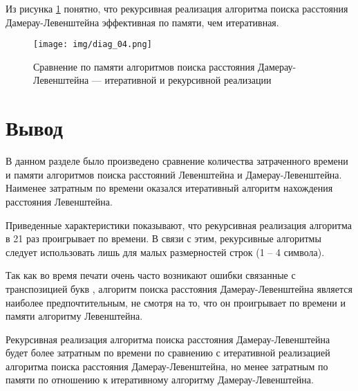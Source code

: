Из рисунка \ref{plt:memory_1} понятно, что рекурсивная реализация алгоритма поиска расстояния Дамерау-Левенштейна эффективная по памяти, чем итеративная.

\begin{figure}[h]
	\centering
	\texttt{[image: img/diag\_04.png]}
	\caption{Сравнение по памяти алгоритмов поиска расстояния Дамерау-Левенштейна --- итеративной и рекурсивной реализации}
	\label{plt:memory_1}
\end{figure}

\clearpage

\section{Вывод}

В данном разделе было произведено сравнение количества затраченного времени и памяти алгоритмов поиска расстояний Левенштейна и Дамерау-Левенштейна. Наименее затратным по времени оказался итеративный алгоритм нахождения расстояния Левенштейна.

Приведенные характеристики показывают, что рекурсивная реализация алгоритма в 21 раз проигрывает по времени. В связи с этим, рекурсивные алгоритмы следует использовать лишь для малых размерностей строк (1 -- 4 символа).

Так как во время печати очень часто возникают ошибки связанные с транспозицией букв \cite{ulianov}, алгоритм поиска расстояния Дамерау-Левенштейна является наиболее предпочтительным, не смотря на то, что он проигрывает по времени и памяти алгоритму Левенштейна.

Рекурсивная реализация алгоритма поиска расстояния Дамерау-Левенштейна будет более затратным по времени по сравнению с итеративной реализацией алгоритма поиска расстояния Дамерау-Левенштейна, но менее затратным по памяти по отношению к итеративному алгоритму Дамерау-Левенштейна.

